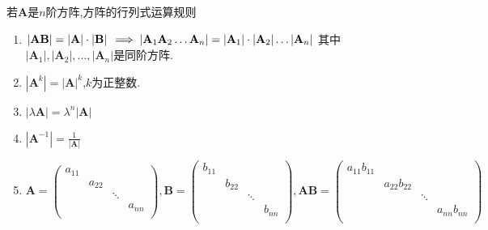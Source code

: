 若$\mathbf{A}$是$n$阶方阵,方阵的行列式运算规则
\begin{enumerate}
    \item $\left\lvert \mathbf{A} \mathbf{B} \right\rvert =\left\lvert \mathbf{A} \right\rvert \cdot\left\lvert \mathbf{B} \right\rvert \\
    \implies \left\lvert \mathbf{A} _1\mathbf{A} _2\dots \mathbf{A} _n\right\rvert =\left\lvert \mathbf{A} _1 \right\rvert \cdot \left\lvert \mathbf{A} _2 \right\rvert \dots \left\lvert \mathbf{A} _n \right\rvert $ 其中$\left\lvert \mathbf{A} _1 \right\rvert , \left\lvert \mathbf{A} _2 \right\rvert ,\dots ,\left\lvert \mathbf{A} _n \right\rvert $是同阶方阵.
    \item $\left\lvert \mathbf{A}^k \right\rvert =\left\lvert \mathbf{A} \right\rvert^k$,$k$为正整数.
    \item $\left\lvert \lambda \mathbf{A} \right\rvert =\lambda^n\left\lvert \mathbf{A} \right\rvert$
    \item {\color{Blue}$\left\lvert \mathbf{A}^{-1} \right\rvert =\frac{1}{\left\lvert \mathbf{A} \right\rvert}$}
    \item \begin{equation*}
        \mathbf{A} =\begin{pmatrix}
        a_{11}   &      &      &      \\
           &   a_{22}   &      &      \\
           &      &   \ddots   &      \\
           &      &      &   a_{nn}   \\
        \end{pmatrix},
        \mathbf{B}=\begin{pmatrix}
            b_{11}   &      &      &      \\
               &   b_{22}   &      &      \\
               &      &   \ddots   &      \\
               &      &      &   b_{nn}   \\
            \end{pmatrix},
        \mathbf{A}\mathbf{B}=\begin{pmatrix}
            a_{11}b_{11}   &      &      &      \\
               &   a_{22}b_{22}   &      &      \\
               &      &   \ddots   &      \\
               &      &      &   a_{nn}b_{nn}   \\

\end{pmatrix}
\end{equation*}
\end{enumerate}
